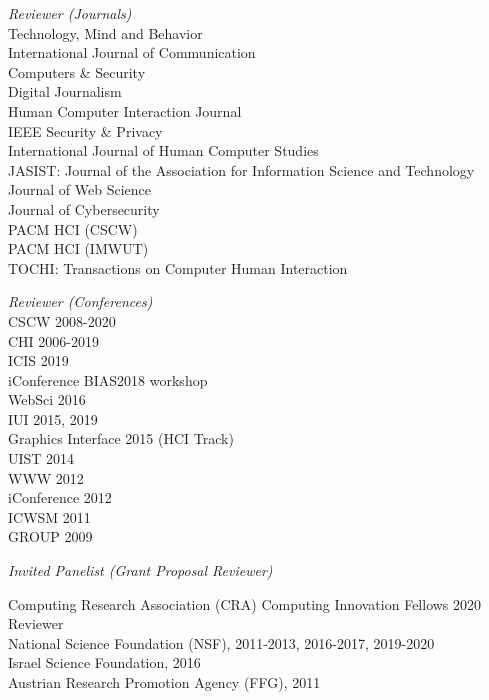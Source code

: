 \documentclass[9pt]{extarticle}
\begin{document}
\emph{Reviewer (Journals)} \\
\vspace{1pt}
Technology, Mind and Behavior \\
International Journal of Communication \\
Computers \& Security \\ 
Digital Journalism \\
Human Computer Interaction Journal \\
IEEE Security \& Privacy \\
International Journal of Human Computer Studies \\
JASIST: Journal of the Association for Information Science and Technology \\
Journal of Web Science \\
Journal of Cybersecurity \\ 
PACM HCI (CSCW) \\
PACM HCI (IMWUT) \\ 
TOCHI: Transactions on Computer Human Interaction


\emph{Reviewer (Conferences)} \\
\vspace{1pt}
CSCW 2008-2020 \\
CHI 2006-2019 \\
ICIS 2019 \\
iConference BIAS2018 workshop \\
WebSci 2016 \\
IUI 2015, 2019 \\
Graphics Interface 2015 (HCI Track) \\
UIST 2014 \\
WWW 2012 \\
iConference 2012 \\
ICWSM 2011 \\
GROUP 2009

\emph{Invited Panelist (Grant Proposal Reviewer)} \\
\vspace{1pt}

Computing Research Association (CRA) Computing Innovation Fellows 2020 Reviewer \\
National Science Foundation (NSF), 2011-2013, 2016-2017, 2019-2020 \\
Israel Science Foundation, 2016 \\
Austrian Research Promotion Agency (FFG), 2011


\end{document}
